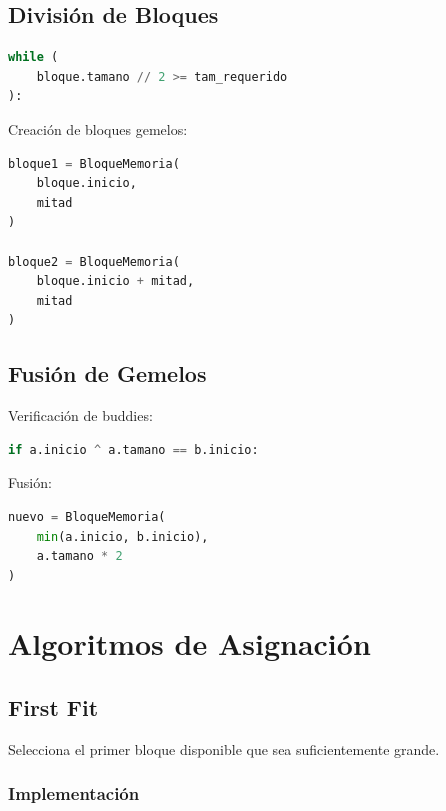 \subsection{División de Bloques}

\begin{lstlisting}[language=Python]
while (
    bloque.tamano // 2 >= tam_requerido
):
\end{lstlisting}

Creación de bloques gemelos:

\begin{lstlisting}[language=Python]
bloque1 = BloqueMemoria(
    bloque.inicio,
    mitad
)

bloque2 = BloqueMemoria(
    bloque.inicio + mitad,
    mitad
)
\end{lstlisting}


\subsection{Fusión de Gemelos}

Verificación de buddies:

\begin{lstlisting}[language=Python]
if a.inicio ^ a.tamano == b.inicio:
\end{lstlisting}

Fusión:

\begin{lstlisting}[language=Python]
nuevo = BloqueMemoria(
    min(a.inicio, b.inicio),
    a.tamano * 2
)
\end{lstlisting}


\section{Algoritmos de Asignación}

\subsection{First Fit}

Selecciona el primer bloque disponible que sea suficientemente grande.

\subsubsection{Implementación}

